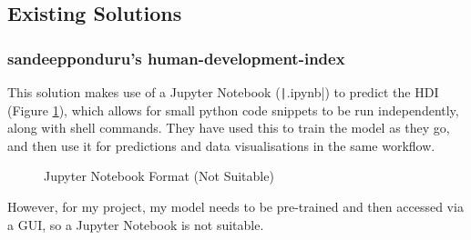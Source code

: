 \documentclass[12pt]{report}
\newcommand{\pil}[1]{\protect\texttt|#1|}
\begin{document}
\subsection{Existing Solutions}
\subsubsection{sandeepponduru's human-development-index \cite{existingSol1}}
This solution makes use of a Jupyter Notebook (\pil{.ipynb}) to predict the HDI (Figure \ref{fig:es1a}), which allows for small python code snippets to be run independently, along with shell commands. They have used this to train the model as they go, and then use it for predictions and data visualisations in the same workflow.
\begin{figure}[H]
\centering
{}
\caption{Jupyter Notebook Format (Not Suitable)}\label{fig:es1a}
\end{figure}
However, for my project, my model needs to be pre-trained and then accessed via a GUI, so a Jupyter Notebook is not suitable.
\end{document}
